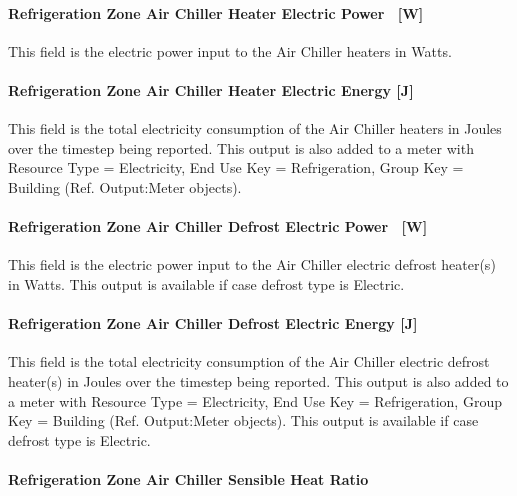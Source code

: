 \paragraph{Refrigeration Zone Air Chiller Heater Electric Power~ {[}W{]}}\label{refrigeration-zone-air-chiller-heater-electric-power-w}

This field is the electric power input to the Air Chiller heaters in Watts.

\paragraph{Refrigeration Zone Air Chiller Heater Electric Energy {[}J{]}}\label{refrigeration-zone-air-chiller-heater-electric-energy-j}

This field is the total electricity consumption of the Air Chiller heaters in Joules over the timestep being reported. This output is also added to a meter with Resource Type = Electricity, End Use Key = Refrigeration, Group Key = Building (Ref. Output:Meter objects).

\paragraph{Refrigeration Zone Air Chiller Defrost Electric Power~ {[}W{]}}\label{refrigeration-zone-air-chiller-defrost-electric-power-w}

This field is the electric power input to the Air Chiller electric defrost heater(s) in Watts. This output is available if case defrost type is Electric.

\paragraph{Refrigeration Zone Air Chiller Defrost Electric Energy {[}J{]}}\label{refrigeration-zone-air-chiller-defrost-electric-energy-j}

This field is the total electricity consumption of the Air Chiller electric defrost heater(s) in Joules over the timestep being reported. This output is also added to a meter with Resource Type = Electricity, End Use Key = Refrigeration, Group Key = Building (Ref. Output:Meter objects). This output is available if case defrost type is Electric.

\paragraph{Refrigeration Zone Air Chiller Sensible Heat Ratio}\label{refrigeration-zone-air-chiller-sensible-heat-ratio}

